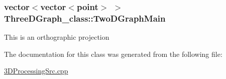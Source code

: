 \subsubsection[{\texorpdfstring{Two\+D\+Graph\+Main}{TwoDGraphMain}}]{\setlength{\rightskip}{0pt plus 5cm}vector$<$vector$<${\bf point}$>$ $>$ Three\+D\+Graph\+\_\+class\+::\+Two\+D\+Graph\+Main\hspace{0.3cm}{\ttfamily [static]}}\hypertarget{classThreeDGraph__class_afd5d9b6402095228768016568f11e50c}{}\label{classThreeDGraph__class_afd5d9b6402095228768016568f11e50c}
This is an orthographic projection 

The documentation for this class was generated from the following file\+:\begin{DoxyCompactItemize}
\item 
\hyperlink{3DProcessingSrc_8cpp}{3\+D\+Processing\+Src.\+cpp}\end{DoxyCompactItemize}
